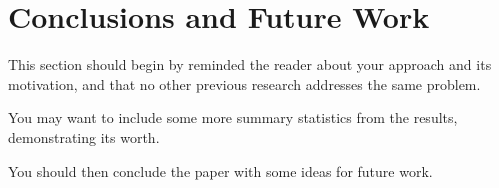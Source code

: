 \section{Conclusions and Future Work}
\label{sec:conclusions-and-future-work}

This section should begin by reminded the reader about your approach and its
motivation, and that no other previous research addresses the same problem.

You may want to include some more summary statistics from the results,
demonstrating its worth.

You should then conclude the paper with some ideas for future work.
